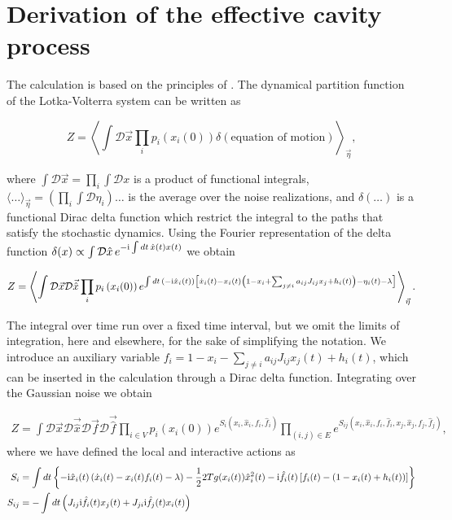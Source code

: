 \documentclass[
    preprint,
    linenumbers,
    amsmath,amssymb,amsfonts,
    aps, physrev,
    superscriptaddress,
    10pt,
    bibnotes
    ]{revtex4-2}
\begin{document}
\section{\label{sec:effective_cav_proc}Derivation of the effective cavity process}

The calculation is based on the principles of \cite{taraboloGaussianApproximationDynamic2025}.
The dynamical partition function of the Lotka-Volterra system can
be written as

\begin{equation}
  Z=\left\langle \int\mathcal{D}\vec{x}\prod_{i}p_{i}\left(x_{i}\left(0\right)\right)\delta\left(\text{equation of motion}\right)\right\rangle _{\vec{\eta}},
\end{equation}

where $\int\mathcal{D}\vec{x}=\prod_{i}\int\mathcal{D}x$ is a product
of functional integrals, $\langle\dots\rangle_{\vec{\eta}}=\left(\prod_{i}\int\mathcal{D}\eta_{i}\right)\dots$
is the average over the noise realizations, and $\delta(\dots)$ is
a functional Dirac delta function which restrict the integral to the
paths that satisfy the stochastic dynamics. Using the Fourier representation
of the delta function $\delta(x)\propto\int\mathcal{D}\hat{x}\,e^{-{\rm i}\int dt\,\hat{x}(t)x(t)}$
we obtain

\begin{equation}
Z=\left\langle \int\mathcal{D}\vec{x}\mathcal{D}\vec{\hat{x}}\prod_{i}p_{i}\left(x_{i}(0)\right)e^{\int dt\,({-{\rm i}}\hat{x}_{i}(t))\left[\dot{x}_{i}(t)-x_{i}(t)\left(1-x_{i}+\sum_{j\neq i}a_{ij}J_{ij}x_{j}+h_{i}(t)\right)-\eta_i(t)-\lambda\right]}\right\rangle _{\vec{\eta}}.
\end{equation}

The integral over time run over a fixed time interval, but we omit the limits of integration, here and elsewhere, for the sake of simplifying the notation. We introduce an auxiliary variable $f_i=1-x_i-\sum_{j\neq i}a_{ij}J_{ij}x_j(t)+h_i(t)$, which can be inserted in the calculation through a Dirac delta function. Integrating over the Gaussian noise we obtain

\begin{align}
Z =\int\mathcal{D}\vec{x}\mathcal{D}\vec{\hat{x}}\mathcal{D}\vec{f}\mathcal{D}\vec{\hat{f}}\prod_{i\in V}p_{i}\left(x_{i}(0)\right)e^{S_i\left(x_i,\hat{x}_i,f_i,\hat{f}_i\right)}\prod_{(i,j)\in E}e^{S_{ij}\left(x_i,\hat{x}_i,f_i,\hat{f}_i,x_j,\hat{x}_j,f_j,\hat{f}_j\right)},
\end{align}
where we have defined the local and interactive actions as
\begin{align}
  S_i & = \int dt \left\{-{\rm i}\hat{x}_i(t)\left(\dot{x}_i(t)-x_i(t)f_i(t)-\lambda\right)-\frac{1}{2}2Tg(x_i(t))\hat{x}_i^2(t)-{\rm i}\hat{f}_i(t)\left[f_i(t)-\left(1-x_i(t)+h_i(t)\right)\right] \right\}\\
  S_{ij} & = -\int dt\left(J_{ij}{\rm i}\hat{f}_i(t)x_j(t)+J_{ji}{\rm i}\hat{f}_j(t)x_i(t) \right)
\end{align}
\end{document}
